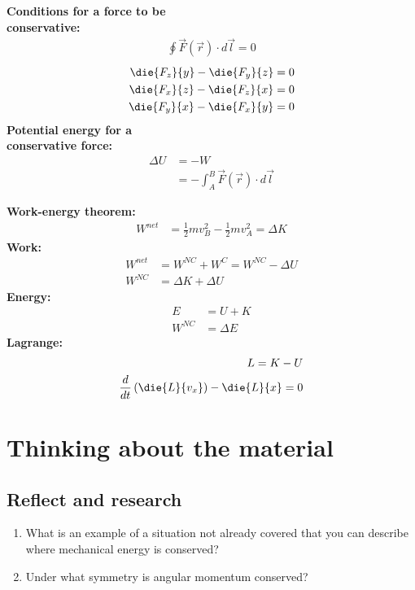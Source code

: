 \newpage
\begin{importantEquations}
\begin{multicols}{2}
\textbf{Conditions for a force to be\\ conservative:}
\begin{align*}
\oint \vec F(\vec r) \cdot d\vec l = 0
\end{align*}
\begin{align*}
\die{F_z}{y}-\die{F_y}{z} &= 0 \nonumber\\
\die{F_x}{z}-\die{F_z}{x} &= 0\nonumber\\
\die{F_y}{x}-\die{F_x}{y} &= 0
\end{align*}
\textbf{Potential energy for a\\ conservative force:}
\begin{align*}
\Delta U&=-W\\
&= - \int_A^B \vec F(\vec r) \cdot d\vec l
\end{align*}
\columnbreak

\textbf{Work-energy theorem:}
\begin{align*}
W^{net}&=\frac{1}{2}mv_B^2-\frac{1}{2}mv_A^2=\Delta K
\end{align*}
\textbf{Work:}
\begin{align*}
W^{net}&=W^{NC}+W^{C}=W^{NC}-\Delta U\\
W^{NC}&=\Delta K+\Delta U
\end{align*}
\textbf{Energy:}
\begin{align*}
E&=U+K\\
W^{NC}&=\Delta E
\end{align*}
\textbf{Lagrange:}
\begin{align*}
L = K - U\\
\frac{d}{dt}\left(\die{L}{v_x}\right)-\die{L}{x} = 0
\end{align*}
\end{multicols}
\end{importantEquations}


\newpage
\section{Thinking about the material}
\subsection{Reflect and research}

\begin{enumerate}
\item What is an example of a situation not already covered that you can describe where mechanical energy is conserved?
\item Under what symmetry is angular momentum conserved?
\end{enumerate}
